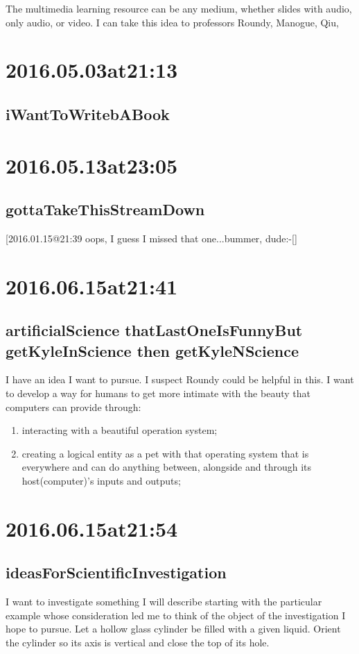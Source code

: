 The multimedia learning resource can be any medium, whether slides with audio, only audio, or video. I can take this idea to professors Roundy, Manogue, Qiu, 

\section*{2016.05.03at21:13}
\subsection*{iWantToWritebABook}

\section*{ 2016.05.13at23:05 }
\subsection*{ gottaTakeThisStreamDown }
[2016.01.15@21:39 oops, I guess I missed that one...bummer, dude:-[]


\section*{ 2016.06.15at21:41 }
\subsection*{ artificialScience thatLastOneIsFunnyBut getKyleInScience then getKyleNScience }
I have an idea I want to pursue.
I suspect Roundy could be helpful in this.
I want to develop a way for humans to get more intimate with the beauty that computers can provide through:
\begin{enumerate}
\item interacting with a beautiful operation system;
\item creating a logical entity as a pet with that operating system that is everywhere and can do anything between, alongside and through its host(computer)'s inputs and outputs;
\end{enumerate}

\section*{ 2016.06.15at21:54 }
\subsection*{ ideasForScientificInvestigation }
I want to investigate something I will describe starting with the particular example whose consideration led me to think of the object of the investigation I hope to pursue.
Let a hollow glass cylinder be filled with a given liquid.
Orient the cylinder so its axis is vertical and close the top of its hole.

